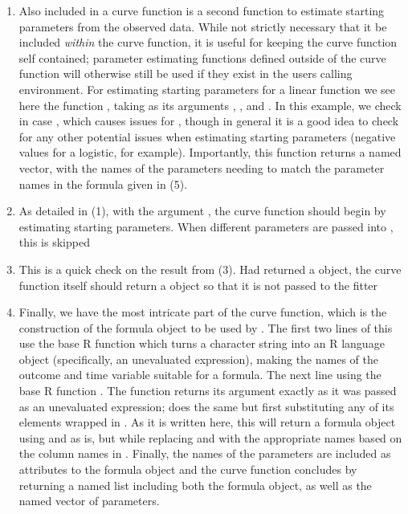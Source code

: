 \begin{enumerate}
\item Also included in a curve function is a second function to estimate starting parameters from the observed data. While not strictly necessary that it be included \textit{within} the curve function, it is useful for keeping the curve function self contained; parameter estimating functions defined outside of the curve function will otherwise still be used if they exist in the users calling environment. For estimating starting parameters for a linear function we see here the function , taking as  its arguments , , and . In this example, we check in case , which causes issues for , though in general it is a good idea to check for any other potential issues when estimating starting parameters (negative values for a logistic, for example). Importantly, this function returns a named vector, with the names of the parameters needing to match the parameter names in the formula given in (5). 
\item As detailed in (1), with the argument , the curve function should begin by estimating starting parameters. When different parameters are passed into , this is skipped
\item This is a quick check on the result from (3). Had  returned a  object, the curve function itself should return a  object so that it is not passed to the fitter
\item Finally, we have the most intricate part of the curve function, which is the construction of the formula object to be used by . The first two lines of this use the base R function  which turns a character string into an R language object (specifically, an unevaluated expression), making the names of the outcome and time variable suitable for a formula. The next line using the base R function . The function  returns its argument exactly as it was passed as an unevaluated expression;  does the same but first substituting any of its elements wrapped in . As it is written here, this will return a formula object using  and  as is, but while replacing  and  with the appropriate names based on the column names in . Finally, the names of the parameters are included as attributes to the formula object and the curve function concludes by returning a named list including both the formula object, as well as the named vector of parameters.
\end{enumerate}

